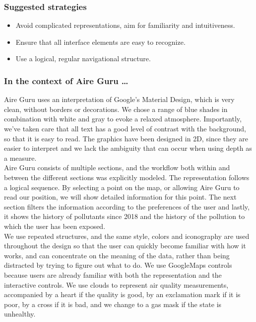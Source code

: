 \subsubsection*{Suggested strategies} 

\begin{itemize}
    \item Avoid complicated representations, aim for familiarity and intuitiveness.

    \item Ensure that all interface elements are easy to recognize.
    
    \item Use a logical, regular navigational structure.
\end{itemize}

\subsubsection*{In the context of Aire Guru \ldots}

Aire Guru uses an interpretation of Google's Material Design, which is very clean, without borders or decorations.
We chose a range of blue shades in combination with white and gray to evoke a relaxed atmosphere.
Importantly, we've taken care that all text has a good level of contrast with the background, so that it is easy to read.
The graphics have been designed in 2D, since they are easier to interpret and we lack the ambiguity that can occur when using depth as a measure.\\

Aire Guru consists of multiple sections, and the workflow both within and between the different sections was explicitly modeled.
The representation follows a logical sequence.
By selecting a point on the map, or allowing Aire Guru to read our position, we will show detailed information for this point.
The next section filters the information according to the preferences of the user and lastly, it shows the history of pollutants since 2018 and the history of the pollution to which the user has been exposed.\\

We use repeated structures, and the same style, colors and iconography are used throughout the design so that the user can quickly become familiar with how it works, and can
concentrate on the meaning of the data, rather than being distracted by trying to figure out what to do.
We use GoogleMaps controls because users are already familiar with both the representation and the interactive controls.
We use clouds to represent air quality measurements, accompanied by a heart if the quality is good, by an exclamation mark if it is poor, by a cross if it is bad, and we change to a gas mask if the state is unhealthy.\\

